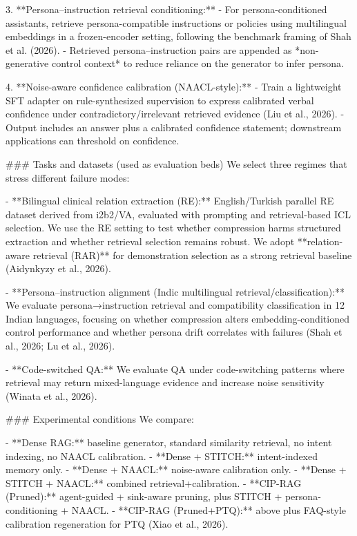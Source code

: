 3. **Persona–instruction retrieval conditioning:**  
   - For persona-conditioned assistants, retrieve persona-compatible instructions or policies using multilingual embeddings in a frozen-encoder setting, following the benchmark framing of Shah et al. (2026).  
   - Retrieved persona–instruction pairs are appended as *non-generative control context* to reduce reliance on the generator to infer persona.

4. **Noise-aware confidence calibration (NAACL-style):**  
   - Train a lightweight SFT adapter on rule-synthesized supervision to express calibrated verbal confidence under contradictory/irrelevant retrieved evidence (Liu et al., 2026).  
   - Output includes an answer plus a calibrated confidence statement; downstream applications can threshold on confidence.

### Tasks and datasets (used as evaluation beds)
We select three regimes that stress different failure modes:

- **Bilingual clinical relation extraction (RE):** English/Turkish parallel RE dataset derived from i2b2/VA, evaluated with prompting and retrieval-based ICL selection. We use the RE setting to test whether compression harms structured extraction and whether retrieval selection remains robust. We adopt **relation-aware retrieval (RAR)** for demonstration selection as a strong retrieval baseline (Aidynkyzy et al., 2026).

- **Persona–instruction alignment (Indic multilingual retrieval/classification):** We evaluate persona→instruction retrieval and compatibility classification in 12 Indian languages, focusing on whether compression alters embedding-conditioned control performance and whether persona drift correlates with failures (Shah et al., 2026; Lu et al., 2026).

- **Code-switched QA:** We evaluate QA under code-switching patterns where retrieval may return mixed-language evidence and increase noise sensitivity (Winata et al., 2026).

### Experimental conditions  
We compare:

- **Dense RAG:** baseline generator, standard similarity retrieval, no intent indexing, no NAACL calibration.
- **Dense + STITCH:** intent-indexed memory only.
- **Dense + NAACL:** noise-aware calibration only.
- **Dense + STITCH + NAACL:** combined retrieval+calibration.
- **CIP-RAG (Pruned):** agent-guided + sink-aware pruning, plus STITCH + persona-conditioning + NAACL.
- **CIP-RAG (Pruned+PTQ):** above plus FAQ-style calibration regeneration for PTQ (Xiao et al., 2026).


